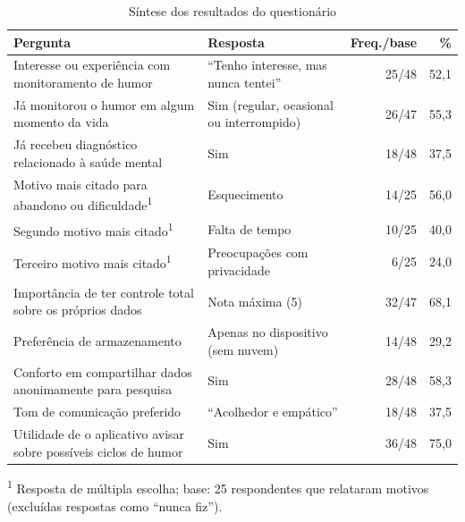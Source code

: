 \begin{table}[H]
    \centering
    \caption{Síntese dos resultados do questionário}
    \label{tab:survey-summary}
    \small
    \renewcommand{\arraystretch}{1.3}   %
    \setlength{\aboverulesep}{0.4ex}
    \setlength{\belowrulesep}{0.4ex}
    \begin{tabularx}{\textwidth}{@{}>{\raggedright\arraybackslash\hsize=1.25\hsize}X
                                   >{\raggedright\arraybackslash\hsize=0.75\hsize}X
                                   r r@{}}
        \toprule
        \textbf{Pergunta} & \textbf{Resposta} & \textbf{Freq./base} & \textbf{\%} \\
        \midrule
        Interesse ou experiência com monitoramento de humor
            & ``Tenho interesse, mas nunca tentei'' & 25/48 & 52,1 \\
        \cmidrule[0.25pt]{1-4}
        Já monitorou o humor em algum momento da vida
            & Sim (regular, ocasional ou interrompido) & 26/47 & 55,3 \\
        \cmidrule[0.25pt]{1-4}
        Já recebeu diagnóstico relacionado à saúde mental
            & Sim & 18/48 & 37,5 \\
        \midrule
        Motivo mais citado para abandono ou dificuldade\textsuperscript{1}
            & Esquecimento & 14/25 & 56,0 \\
        \cmidrule[0.25pt]{1-4}
        Segundo motivo mais citado\textsuperscript{1}
            & Falta de tempo & 10/25 & 40,0 \\
        \cmidrule[0.25pt]{1-4}
        Terceiro motivo mais citado\textsuperscript{1}
            & Preocupações com privacidade & 6/25 & 24,0 \\
        \midrule
        Importância de ter controle total sobre os próprios dados
            & Nota máxima (5) & 32/47 & 68,1 \\
        \cmidrule[0.25pt]{1-4}
        Preferência de armazenamento
            & Apenas no dispositivo (sem nuvem) & 14/48 & 29,2 \\
        \cmidrule[0.25pt]{1-4}
        Conforto em compartilhar dados anonimamente para pesquisa
            & Sim & 28/48 & 58,3 \\
        \midrule
        Tom de comunicação preferido
            & ``Acolhedor e empático'' & 18/48 & 37,5 \\
        \cmidrule[0.25pt]{1-4}
        Utilidade de o aplicativo avisar sobre possíveis ciclos de humor
            & Sim & 36/48 & 75,0 \\
        \bottomrule
    \end{tabularx}
    \par\vspace{2pt}
    {\footnotesize \textsuperscript{1} Resposta de múltipla escolha; base: 25
    respondentes que relataram motivos (excluídas respostas como ``nunca fiz'').}
\end{table}

